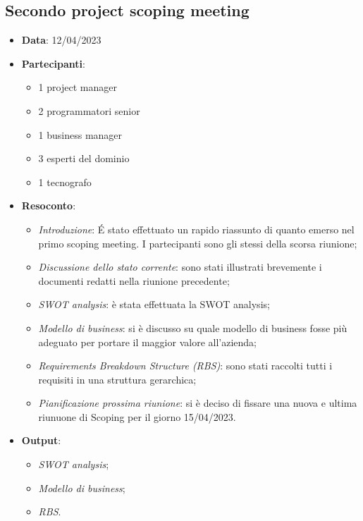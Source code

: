 \documentclass{article}
\begin{document}
  \subsection{Secondo project scoping meeting}
  \begin{itemize}
    \item \textbf{Data}: 12/04/2023
    \item \textbf{Partecipanti}:
    \begin{itemize}
      \item 1 project manager
      \item 2 programmatori senior
      \item 1 business manager
      \item 3 esperti del dominio
      \item 1 tecnografo
    \end{itemize}
    \item \textbf{Resoconto}:
    \begin{itemize}
      \item \emph{Introduzione}: É stato effettuato un rapido riassunto di quanto emerso nel 
        primo scoping meeting. I partecipanti sono gli stessi della scorsa riunione;
      \item \emph{Discussione dello stato corrente}: sono stati illustrati brevemente i documenti redatti 
        nella riunione precedente;
      \item \emph{SWOT analysis}: è stata effettuata la SWOT analysis;
      \item \emph{Modello di business}: si è discusso su quale modello di business fosse più adeguato per
        portare il maggior valore all'azienda;
      \item \emph{Requirements Breakdown Structure (RBS)}: sono stati raccolti tutti i requisiti in una 
        struttura gerarchica;
      \item \emph{Pianificazione prossima riunione}: si è deciso di fissare una nuova e ultima riunuone di Scoping 
        per il giorno 15/04/2023.
    \end{itemize}
    \item \textbf{Output}:
    \begin{itemize}
      \item \emph{SWOT analysis};
      \item \emph{Modello di business};
      \item \emph{RBS}.
    \end{itemize}
  \end{itemize}
\end{document}
